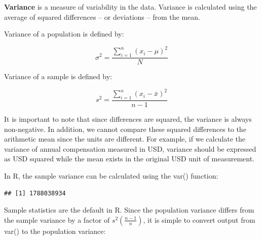 \documentclass[]{book}
\newenvironment{Shaded}{\begin{snugshade}}{\end{snugshade}}
\newcommand{\CommentTok}[1]{\textcolor[rgb]{0.56,0.35,0.01}{\textit{#1}}}
\newcommand{\DecValTok}[1]{\textcolor[rgb]{0.00,0.00,0.81}{#1}}
\newcommand{\KeywordTok}[1]{\textcolor[rgb]{0.13,0.29,0.53}{\textbf{#1}}}
\newcommand{\NormalTok}[1]{#1}
\newcommand{\OperatorTok}[1]{\textcolor[rgb]{0.81,0.36,0.00}{\textbf{#1}}}
\newcommand{\StringTok}[1]{\textcolor[rgb]{0.31,0.60,0.02}{#1}}
\begin{document}
\textbf{Variance} is a measure of variability in the data. Variance is calculated using the average of squared differences -- or deviations -- from the mean.

Variance of a population is defined by:

\[ \sigma^{2} = \frac{\displaystyle\sum_{i=1}^{n} (x_{i}-\mu)^{2}}{N} \]

Variance of a sample is defined by:

\[ s^{2} = \frac{\displaystyle\sum_{i=1}^{n} (x_{i}-\bar{x})^{2}}{n-1} \]

It is important to note that since differences are squared, the variance is always non-negative. In addition, we cannot compare these squared differences to the arithmetic mean since the units are different. For example, if we calculate the variance of annual compensation measured in USD, variance should be expressed as USD squared while the mean exists in the original USD unit of measurement.

In R, the sample variance can be calculated using the var() function:

\begin{Shaded}
\end{Shaded}

\begin{verbatim}
## [1] 1788038934
\end{verbatim}

Sample statistics are the default in R. Since the population variance differs from the sample variance by a factor of \(s^2 (\frac{n - 1}{n})\), it is simple to convert output from var() to the population variance:

\begin{Shaded}
\end{Shaded}
\end{document}

